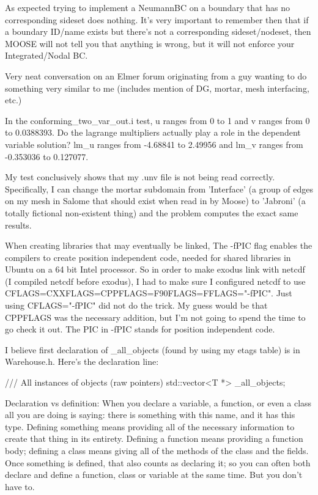 As expected trying to implement a NeumannBC on a boundary that has no corresponding sideset does nothing. It's very important to remember then that if a boundary ID/name exists but there's not a corresponding sideset/nodeset, then MOOSE will not tell you that anything is wrong, but it will not enforce your Integrated/Nodal BC.

Very neat conversation on an Elmer forum originating from a guy wanting to do something very similar to me (includes mention of DG, mortar, mesh interfacing, etc.)

In the conforming_two_var_out.i test, u ranges from 0 to 1 and v ranges from 0 to 0.0388393. Do the lagrange multipliers actually play a role in the dependent variable solution? lm_u ranges from -4.68841 to 2.49956 and lm_v ranges from -0.353036 to 0.127077.

My test conclusively shows that my .unv file is not being read correctly. Specifically, I can change the mortar subdomain from 'Interface' (a group of edges on my mesh in Salome that should exist when read in by Moose) to 'Jabroni' (a totally fictional non-existent thing) and the problem computes the exact same results.

When creating libraries that may eventually be linked, The -fPIC flag enables the compilers to create position independent code, needed for shared libraries in Ubuntu on a 64 bit Intel processor. So in order to make exodus link with netcdf (I compiled netcdf before exodus), I had to make sure I configured netcdf to use CFLAGS=CXXFLAGS=CPPFLAGS=F90FLAGS=FFLAGS="-fPIC". Just using CFLAGS="-fPIC" did not do the trick. My guess would be that CPPFLAGS was the necessary addition, but I'm not going to spend the time to go check it out. The PIC in -fPIC stands for position independent code.

I believe first declaration of _all_objects (found by using my etags table) is in Warehouse.h. Here's the declaration line:

  /// All instances of objects (raw pointers)
  std::vector<T *> _all_objects;

Declaration vs definition: When you declare a variable, a function, or even a class all you are doing is saying: there is something with this name, and it has this type. Defining something means providing all of the necessary information to create that thing in its entirety. Defining a function means providing a function body; defining a class means giving all of the methods of the class and the fields. Once something is defined, that also counts as declaring it; so you can often both declare and define a function, class or variable at the same time. But you don't have to.

